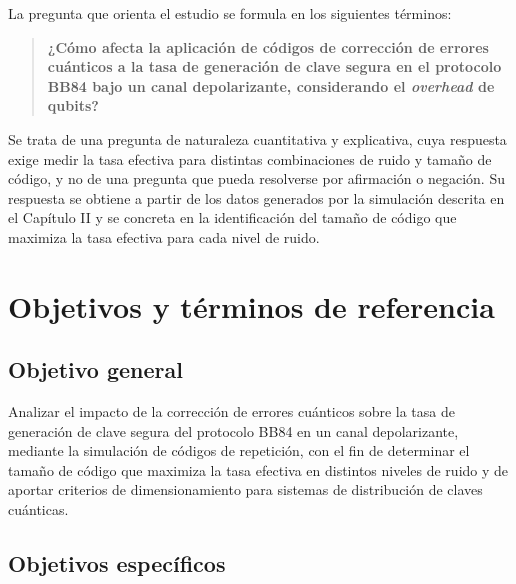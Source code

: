 \documentclass[12pt]{report}
\begin{document}
La pregunta que orienta el estudio se formula en los siguientes términos:

\begin{quote}
\textbf{¿Cómo afecta la aplicación de códigos de corrección de errores cuánticos
a la tasa de generación de clave segura en el protocolo BB84 bajo un canal
depolarizante, considerando el \textit{overhead} de qubits?}
\end{quote}

Se trata de una pregunta de naturaleza cuantitativa y explicativa, cuya respuesta
exige medir la tasa efectiva para distintas combinaciones de ruido y tamaño de
código, y no de una pregunta que pueda resolverse por afirmación o negación. Su
respuesta se obtiene a partir de los datos generados por la simulación descrita
en el Capítulo II y se concreta en la identificación del tamaño de código que
maximiza la tasa efectiva para cada nivel de ruido.

\section{Objetivos y términos de referencia}

\subsection{Objetivo general}

Analizar el impacto de la corrección de errores cuánticos sobre la tasa de
generación de clave segura del protocolo BB84 en un canal depolarizante, mediante
la simulación de códigos de repetición, con el fin de determinar el tamaño de
código que maximiza la tasa efectiva en distintos niveles de ruido y de aportar
criterios de dimensionamiento para sistemas de distribución de claves cuánticas.

\subsection{Objetivos específicos}
\end{document}
